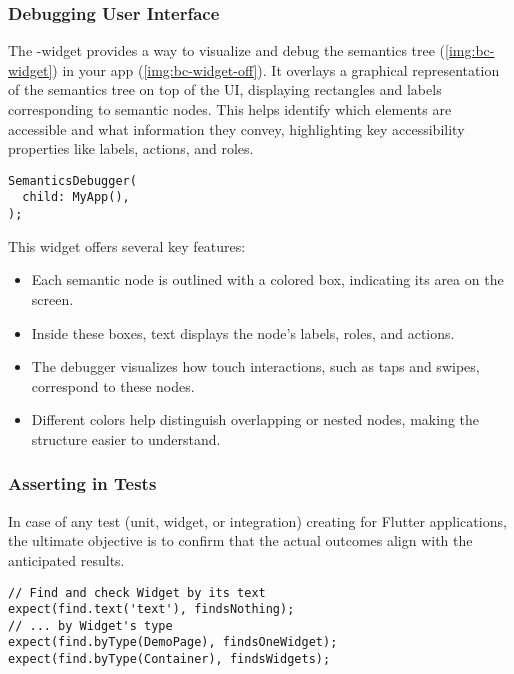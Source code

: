 \newpage
\subsubsection{Debugging User Interface}

The -widget provides a way to visualize and debug the semantics tree (\cref{img:bc-widget})
in your app (\cref{img:bc-widget-off}). It overlays a graphical representation of the semantics tree on top of the UI, 
displaying rectangles and labels corresponding to semantic nodes. This helps identify which elements are accessible and 
what information they convey, highlighting key accessibility properties like labels, actions, and roles.


\begin{lstlisting}
SemanticsDebugger(
  child: MyApp(),
);
\end{lstlisting}

\noindent This widget offers several key features:

\begin{itemize}
  \item Each semantic node is outlined with a colored box, indicating its area on the screen.
  \item Inside these boxes, text displays the node's labels, roles, and actions.
  \item The debugger visualizes how touch interactions, such as taps and swipes, correspond to these nodes.
  \item Different colors help distinguish overlapping or nested nodes, making the structure easier to understand.
\end{itemize}



\newpage
\subsubsection{Asserting in Tests}

In case of any test (unit, widget, or integration) creating for Flutter applications, the ultimate objective is to 
confirm that the actual outcomes align with the anticipated results.

\begin{lstlisting}
// Find and check Widget by its text
expect(find.text('text'), findsNothing);
// ... by Widget's type
expect(find.byType(DemoPage), findsOneWidget);
expect(find.byType(Container), findsWidgets);
\end{lstlisting}

